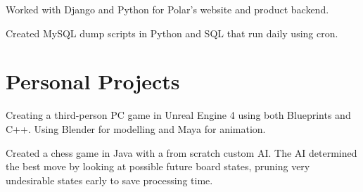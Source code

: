 \documentclass[letterpaper]{deedy-resume-modified} %
\begin{document}
\begin{minipage}[t]{0.70\textwidth}


\begin{tightitemize}
\item Worked with Django and Python for Polar's website and product backend.
\item Created MySQL dump scripts in Python and SQL that run daily using cron.
\end{tightitemize}

\sectionspace %







\vspace{-8pt}
\section{Personal Projects}


Creating a third-person PC game in Unreal Engine 4 using both Blueprints and C++.  Using Blender for modelling and Maya for animation.

\sectionspace %



Created a chess game in Java with a from scratch custom AI. The AI determined the best move by looking at possible future board states, pruning very undesirable states early to save processing time.


\sectionspace %

\end{minipage} %

\end{document}
